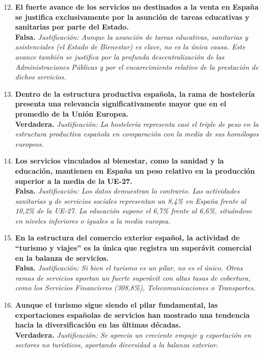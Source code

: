 \begin{enumerate}[label=\textbf{\arabic*.}]
    \setcounter{enumi}{11}

    \item \textbf{El fuerte avance de los servicios no destinados a la venta en España se justifica exclusivamente por la asunción de tareas educativas y sanitarias por parte del Estado.} \\
    \textbf{Falsa.} \textit{Justificación: Aunque la asunción de tareas educativas, sanitarias y asistenciales (el Estado de Bienestar) es clave, no es la única causa. Este avance también se justifica por la profunda descentralización de las Administraciones Públicas y por el encarecimiento relativo de la prestación de dichos servicios.}

    \item \textbf{Dentro de la estructura productiva española, la rama de hostelería presenta una relevancia significativamente mayor que en el promedio de la Unión Europea.} \\
    \textbf{Verdadera.} \textit{Justificación: La hostelería representa casi el triple de peso en la estructura productiva española en comparación con la media de sus homólogos europeos.}

    \item \textbf{Los servicios vinculados al bienestar, como la sanidad y la educación, mantienen en España un peso relativo en la producción superior a la media de la UE-27.} \\
    \textbf{Falsa.} \textit{Justificación: Los datos demuestran lo contrario. Las actividades sanitarias y de servicios sociales representan un 8,4\% en España frente al 10,2\% de la UE-27. La educación supone el 6,7\% frente al 6,6\%, situándose en niveles inferiores o iguales a la media europea.}

    \item \textbf{En la estructura del comercio exterior español, la actividad de ``turismo y viajes'' es la única que registra un superávit comercial en la balanza de servicios.} \\
    \textbf{Falsa.} \textit{Justificación: Si bien el turismo es un pilar, no es el único. Otras ramas de servicios aportan un fuerte superávit con altas tasas de cobertura, como los Servicios Financieros (308,8\%), Telecomunicaciones o Transportes.}

    \item \textbf{Aunque el turismo sigue siendo el pilar fundamental, las exportaciones españolas de servicios han mostrado una tendencia hacia la diversificación en las últimas décadas.} \\
    \textbf{Verdadera.} \textit{Justificación: Se aprecia un creciente empuje y exportación en sectores no turísticos, aportando diversidad a la balanza exterior.}

\end{enumerate}

